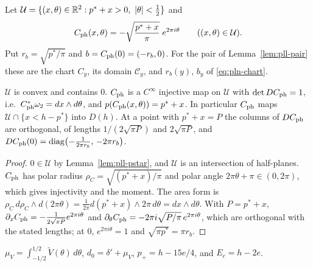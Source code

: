 \begin{definition}\label{def:pll-chart}
Let $\mathcal U=\{(x,\theta)\in\R^2:p^*+x>0,\ |\theta|<\tfrac12\}$ and
\begin{equation}\label{eq:pll-chart}
 C_{\rm ph}(x,\theta)=-\sqrt{\frac{p^*+x}{\pi}}\;e^{2\pi i\theta}\qquad((x,\theta)\in\mathcal U).
\end{equation}
Put $r_b=\sqrt{p^*/\pi}$ and $b=C_{\rm ph}(0)=(-r_b,0)$. For the pair of Lemma~\ref{lem:pll-pair} these are the chart
$C_y$, its domain $\mathcal C_y$, and $r_b(y)$, $b_y$ of \eqref{eq:pln-chart}.
\end{definition}

\begin{lemma}\label{lem:pll-physical-chart}
$\mathcal U$ is convex and contains $0$. $C_{\rm ph}$ is a $C^\infty$ injective map on $\mathcal U$ with
$\det DC_{\rm ph}=1$, i.e.\ $C_{\rm ph}^*\omega_2=dx\wedge d\theta$, and $p(C_{\rm ph}(x,\theta))=p^*+x$. In particular
$C_{\rm ph}$ maps $\mathcal U\cap\{x<h-p^*\}$ into $D(h)$. At a point with $p^*+x=P$ the columns of $DC_{\rm ph}$ are
orthogonal, of lengths $1/(2\sqrt{\pi P})$ and $2\sqrt{\pi P}$, and
$DC_{\rm ph}(0)=\operatorname{diag}\bigl(-\frac1{2\pi r_b},\,-2\pi r_b\bigr)$.
\end{lemma}

\begin{proof}
$0\in\mathcal U$ by Lemma~\ref{lem:pll-pstar}, and $\mathcal U$ is an intersection of half-planes. $C_{\rm ph}$ has
polar radius $\rho_C=\sqrt{(p^*+x)/\pi}$ and polar angle $2\pi\theta+\pi\in(0,2\pi)$, which gives injectivity and the
moment. The area form is $\rho_C\,d\rho_C\wedge d(2\pi\theta)=\frac1{2\pi}d(p^*+x)\wedge2\pi\,d\theta=dx\wedge d\theta$.
With $P=p^*+x$, $\partial_xC_{\rm ph}=-\frac{1}{2\sqrt{\pi P}}e^{2\pi i\theta}$ and
$\partial_\theta C_{\rm ph}=-2\pi i\sqrt{P/\pi}\,e^{2\pi i\theta}$, which are orthogonal with the stated lengths; at $0$,
$e^{2\pi i\theta}=1$ and $\sqrt{\pi p^*}=\pi r_b$.
\end{proof}

\begin{definition}\label{def:pll-comparison-constants}
$\mu_V=\int_{-1/2}^{1/2}\tilde V(\theta)\,d\theta$, $d_0=\delta'+\mu_V$, $p_+=h-15e/4$, and $E_c=h-2e$.
\end{definition}

